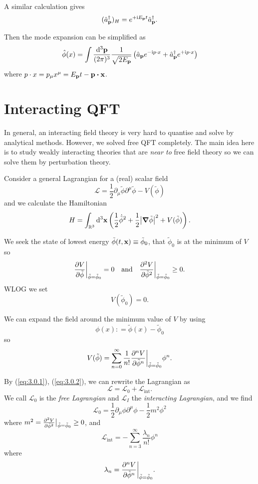 \documentclass[a4paper,11pt]{article}
\begin{document}
	A similar calculation gives
	\[
		(\hat a^{\dagger}_{\vb p})_H = e ^{+\mathrm{i} E _{\vb p}t} \hat a^{\dagger} _{\vb p}.
	\]
	
	Then the mode expansion can be simplified as 
	\[
		\hat \phi(x) = \int \frac{\dd[3]{\vb p}}{(2\pi)^{3}} \frac{1}{\sqrt{2 E _{\vb p}}} \left( \hat a _{\vb p} e ^{- \mathrm{i} p \cdot x} + \hat a ^{\dagger}_{\vb p} e ^{+ \mathrm{i} p \cdot x} \right)
	\]
	where $p \cdot x = p_\mu x^\mu = E _{\vb p}t - \vb p \vdot \vb x$. 
	\newpage
	\section{Interacting QFT}

	In general, an interacting field theory is very hard to quantise and solve by analytical methods. However, we solved free QFT completely. The main idea here is to study weakly interacting theories that are \emph{near to} free field theory so we can solve them by perturbation theory.

	Consider a general Lagrangian for a (real) scalar field
	\[
		\mathcal{L} = \frac{1}{2} \partial_\mu \tilde{\phi} \partial^\mu \tilde \phi - V (\tilde \phi)
	\]
	and we calculate the Hamiltonian
	\[
		H = \int _{\mathbb{R}^3} \dd[3]{\vb x} \left( \frac{1}{2} \dot{\tilde{\phi}}^2 + \frac{1}{2} \abs{\grad \tilde{\phi}}^2 + V(\tilde \phi) \right).
	\]
	
	We seek the state of lowest energy $\tilde \phi(t, \vb x) \equiv \tilde \phi_0$, that $\tilde \phi_0$ is at the minimum of $V$ so
	\begin{equation}
		\pdv{V}{\tilde \phi}\bigg|_{\tilde \phi = \tilde \phi_0} = 0 \quad \text{and} \quad \pdv[2]{V}{\tilde \phi}\bigg|_{\tilde \phi = \tilde \phi_0} \geq 0.
		\label{eq:3.0.1}
	\end{equation}
	WLOG we set \begin{equation}
		V(\tilde \phi_0) = 0.
		\label{eq:3.0.2}
	\end{equation}
	
	We can expand the field around the minimum value of $V$ by using
	\[
		\phi(x) : = \tilde \phi(x) - \tilde \phi_0
	\]
	so
	\[
		V(\tilde \phi) = \sum _{n = 0}^{\infty} \frac{1}{n!} \pdv[n]{V}{\tilde \phi}\bigg|_{\tilde \phi = \tilde \phi_0} \phi^n.
	\]
	
	By (\ref{eq:3.0.1}), (\ref{eq:3.0.2}), we can rewrite the Lagrangian as
	\[
		\mathcal{L} = \mathcal{L}_0 + \mathcal{L}_{\text{int}}.
	\]
	We call $\mathcal{L}_0$ is the \emph{free Lagrangian} and $\mathcal{L}_I$ the \emph{interacting Lagrangian}, and we find
	\[
		\mathcal{L}_0 = \frac{1}{2} \partial_\mu \phi \partial^\mu \phi - \frac{1}{2} m^2 \phi^2
	\]
	where $m^2 = \pdv[2]{V}{\tilde \phi}\big|_{\tilde \phi = \tilde{\phi}_0} \geq 0$, and
	\[
		\mathcal{L}_{\text{int}} = - \sum _{n = 3}^{\infty} \frac{\lambda_n}{n!} \phi^n
	\]
	where
	\[
		\lambda_n = \pdv[n]{V}{\tilde \phi}\bigg|_{\tilde \phi = \tilde{\phi}_0}.
	\]
\end{document}

